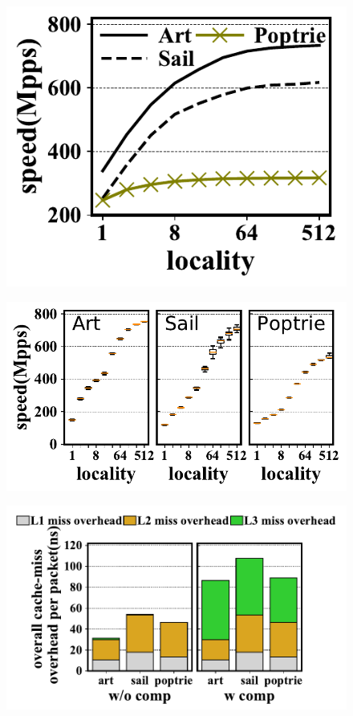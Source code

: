 \documentclass[a4paper]{article}
\begin{document}
    \begin{figure}[htbp]
        \includegraphics{../result/example.pdf}
    \end{figure}

    \begin{figure}[htbp]
        \includegraphics{../result/example2.pdf}
    \end{figure}

    \begin{figure}[htbp]
	\includegraphics{../result/example3.pdf}
\end{figure}
\end{document}
